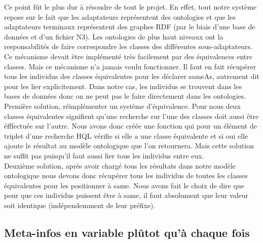 \documentclass[12pt]{article}
\begin{document}
	Ce point fût le plus dur à résoudre de tout le projet. En effet, tout notre système repose sur le fait que les adaptateurs représentent des ontologies et que les adaptateurs terminaux représentent des graphes RDF (par le biais d'une base de données et d'un fichier N3). Les ontologies de plus haut niveaux ont la responsabilités de faire correspondre les classes des différentes sous-adaptateurs.\\
	\indent Ce mécanisme devait être implémenté très facilement par des équivalences entre classes. Mais ce mécanisme n'a jamais voulu fonctionner. Il faut en fait récupérer tous les individus des classes équivalentes pour les déclarer sameAs, autrement dit pour les lier explicitement. Dans notre cas, les individus se trouvent dans les bases de données donc on ne peut pas le faire directement dans les ontologies.\\
	\indent Première solution, réimplémenter un système d'équivalence. Pour nous deux classes équivalentes signifient qu'une recherche sur l'une des classes doit aussi être éfffectuée sur l'autre. Nous avons donc créée une fonction qui pour un élément de triplet d'une recherche HQL vérifie si elle a une classe équivalente et si oui elle ajoute le résultat au modèle ontologique que l'on retournera. Mais cette solution ne suffit pas puisqu'il faut aussi lier tous les individus entre eux.\\
	\indent Deuxième solution, aprés avoir chargé tous les résultats dans notre modèle ontologique nous devons donc récupérer tous les individus de toutes les classes équivalentes pour les positionner à same. Nous avons fait le choix de dire que pour que ces individus puissent être à same, il faut absolument que leur valeur soit identique (indépendemment de leur préfixe).

\subsection{Meta-infos en variable plûtot qu'à chaque fois}
\end{document}
